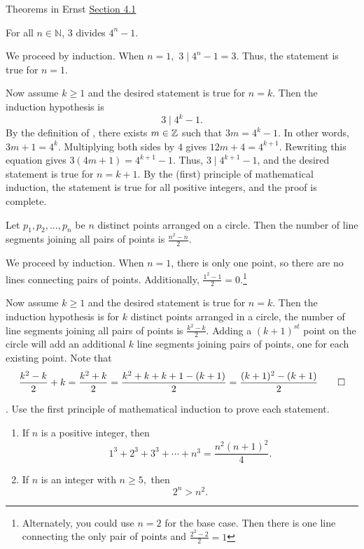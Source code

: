 \documentclass{ximera}
\begin{document}
\begin{br}
Theorems in Ernst \href{https://danaernst.com/IBL-IntroToProof/pretext/sec_Intro_to_Induction.html}{Section 4.1} 
 

\begin{theorem}
For all $n\in\mathbb{N}$, 3 divides $4^{n}-1$.
\end{theorem}
\begin{solution}
We proceed by induction.  When $n=1,$ $3\mid 4^n-1=3$. Thus, the statement is true for $n=1.$

Now assume $k\geq 1$ and the desired statement is true for $n=k$. Then the induction hypothesis is \[3\mid 4^k-1.\]
By the definition of , there exists $m\in\mathbb Z$ such that $3m=4^k-1.$ In other words, $3m+1=4^k$. Multiplying both sides by $4$ gives $12m+4=4^{k+1}$. Rewriting this equation gives $3(4m+1)=4^{k+1}-1$. Thus, $3\mid 4^{k+1}-1$, and the desired statement is true for $n=k+1$. By the (first) principle of mathematical induction, the statement is true for all positive integers, and the proof is complete.
\end{solution}

 \begin{theorem}
 Let $p_{1}, p_{2}, \ldots, p_{n}$ be $n$ distinct points arranged on a circle.  Then the number of line segments joining all pairs of points is $\frac{n^{2}-n}{2}$.
 \end{theorem}
\begin{solution}
 We proceed by induction. When $n=1$, there is only one point, so there are no lines connecting pairs of points. Additionally, $\frac{1^2-1}{2}=0$.\footnote{Alternately, you could use $n=2$ for the base case. Then there is one line connecting the only pair of points and $\frac{2^2-2}{2}=1$}
 
 Now assume $k\geq 1$ and the desired statement is true for $n=k$. Then the induction hypothesis is for $k$ distinct points arranged in a circle, the number of line segments joining all pairs of points is $\frac{k^{2}-k}{2}$. Adding a $(k+1)^{st}$ point on the circle will add an additional $k$ line segments joining pairs of points, one for each existing point. Note that 
 \[ 
 	\frac{k^{2}-k}{2}+k=\frac{k^{2}+k}{2}=
	\frac{k^2+k+k+1-(k+1)}{2}=\frac{(k+1)^{2}-(k+1)}{2}\qedhere
 \]
\end{solution}
\end{br}

\begin{br}
. Use the first principle of mathematical induction to prove each statement.
  \begin{enumerate}
    \item If $n$ is a positive integer, then 
  \[1^3+2^3+3^3+\cdots+n^3=\frac{n^2(n+1)^2}{4}.\]
  
    \item If $n$ is an integer with $n\geq 5,$ then \[2^n>n^2.\]
 
  \end{enumerate}
\end{br}







\end{document}
